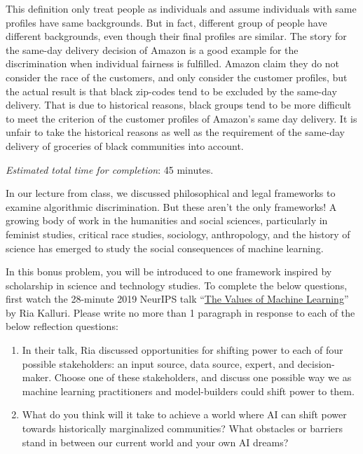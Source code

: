 \documentclass[submit]{harvardml}
\begin{document}
\begin{enumerate}
    This definition only treat people as individuals and assume individuals with same profiles have same backgrounds. But in fact, different group of people have different backgrounds, even though their final profiles are similar. The story for the same-day delivery decision of Amazon is a good example for the discrimination when individual fairness is fulfilled. Amazon claim they do not consider the race of the customers, and only consider the customer profiles, but the actual result is that black zip-codes tend to be excluded by the same-day delivery. That is due to historical reasons, black groups tend to be more difficult to meet the criterion of the customer profiles of Amazon's same day delivery. It is unfair to take the historical reasons as well as the requirement of the same-day delivery of groceries of black communities into account.
\end{enumerate}

\begin{problem}
\emph{Estimated total time for completion}: 45 minutes.

In our lecture from class, we discussed philosophical and legal frameworks to examine algorithmic discrimination.  But these aren't the only frameworks!  A growing body of work in the humanities and social sciences, particularly in feminist studies, critical race studies, sociology, anthropology, and the history of science has emerged to study the social consequences of machine learning.

In this bonus problem, you will be introduced to one framework inspired by scholarship in science and technology studies.  To complete the below questions, first watch the 28-minute 2019 NeurIPS talk ``\href{https://slideslive.com/38923453/the-values-of-machine-learning}{The Values of Machine Learning}'' by Ria Kalluri.  Please write no more than 1 paragraph in response to each of the below reflection questions:

\begin{enumerate}
    \item In their talk, Ria discussed opportunities for shifting power to each of four possible stakeholders: an input source, data source, expert, and decision-maker.  Choose one of these stakeholders, and discuss one possible way we as machine learning practitioners and model-builders could shift power to them.
    \item What do you think will it take to achieve a world where AI can shift power towards historically marginalized communities?  What obstacles or barriers stand in between our current world and your own AI dreams?
\end{enumerate}

\end{problem}
\end{document}
